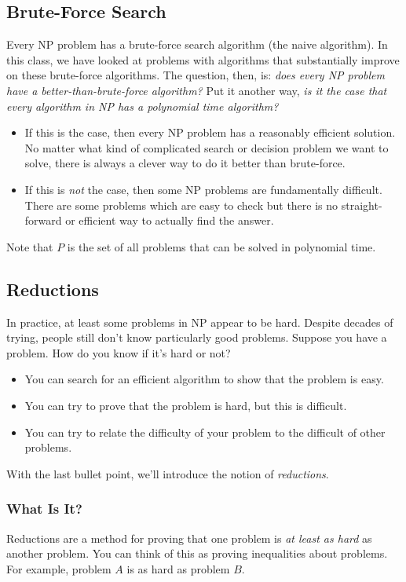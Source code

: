 \documentclass[letterpaper]{article}
\begin{document}
\subsection{Brute-Force Search}
Every NP problem has a brute-force search algorithm (the naive algorithm). In this class, we have looked at problems with algorithms that substantially improve on these brute-force algorithms. The question, then, is: \emph{does every NP problem have a better-than-brute-force algorithm?} Put it another way, \emph{is it the case that every algorithm in NP has a polynomial time algorithm?} 
\begin{itemize}
    \item If this is the case, then every NP problem has a reasonably efficient solution. No matter what kind of complicated search or decision problem we want to solve, there is always a clever way to do it better than brute-force. 
    \item If this is \emph{not} the case, then some NP problems are fundamentally difficult. There are some problems which are easy to check but there is no straight-forward or efficient way to actually find the answer.  
\end{itemize}
Note that $P$ is the set of all problems that can be solved in polynomial time. 

\subsection{Reductions}
In practice, at least some problems in NP appear to be hard. Despite decades of trying, people still don't know particularly good problems. Suppose you have a problem. How do you know if it's hard or not? 
\begin{itemize}
    \item You can search for an efficient algorithm to show that the problem is easy.
    \item You can try to prove that the problem is hard, but this is difficult. 
    \item You can try to relate the difficulty of your problem to the difficult of other problems.
\end{itemize}
With the last bullet point, we'll introduce the notion of \emph{reductions}. 

\subsubsection{What Is It?}
Reductions are a method for proving that one problem is \emph{at least as hard} as another problem. You can think of this as proving inequalities about problems. For example, problem $A$ is as hard as problem $B$. 
\end{document}
